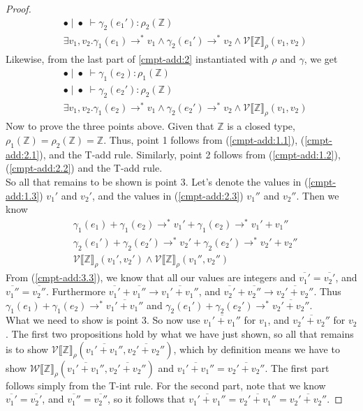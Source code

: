 \documentclass[twoside,11pt,openright]{report}
\theoremstyle{definition}
\newcommand{\expr}{e}
\newcommand{\val}{v}
\newcommand{\Num}[1]{\overline{#1}}
\newcommand{\Tint}{\mathbb{Z}}
\newcommand{\emptenv}{\bullet}
\newcommand{\empvenv}{\bullet}
\newcommand{\jdg}[4]{#1 \; | \; #2 \; \vdash #3 : #4}
\newcommand{\step}{\rightarrow}
\newcommand{\stepS}{\rightarrow^*}
\newcommand{\WtInp}[2]{\mathcal{W} \llbracket #1 \rrbracket_{#2}}
\newcommand{\ValInp}[2]{\mathcal{V} \llbracket #1 \rrbracket_{#2}}
\begin{document}
\begin{proof}
\begin{align}
    &\jdg{\emptenv}{\empvenv}{\gamma_2(\expr_1')}{\rho_2(\Tint)}\label{cmpt-add:1.2}\\
    &\exists \val_1, \val_2 . \gamma_1(\expr_1) \stepS \val_1 \land \gamma_2(\expr_1') \stepS \val_2 \land \ValInp{\Tint}{\rho}(\val_1, \val_2)\label{cmpt-add:1.3}
  \end{align}
  Likewise, from the last part of \ref*{cmpt-add:2} instantiated with $\rho$ and $\gamma$, we get
  \begin{align}
    &\jdg{\emptenv}{\empvenv}{\gamma_1(\expr_2)}{\rho_1(\Tint)}\label{cmpt-add:2.1}\\
    &\jdg{\emptenv}{\empvenv}{\gamma_2(\expr_2')}{\rho_2(\Tint)}\label{cmpt-add:2.2}\\
    &\exists \val_1, \val_2 . \gamma_1(\expr_2) \stepS \val_1 \land \gamma_2(\expr_2') \stepS \val_2 \land \ValInp{\Tint}{\rho}(\val_1, \val_2)\label{cmpt-add:2.3}
  \end{align}
  Now to prove the three points above. Given that $\Tint$ is a closed type, $\rho_1(\Tint) = \rho_2(\Tint) = \Tint$. Thus, point 1 follows from (\ref*{cmpt-add:1.1}), (\ref*{cmpt-add:2.1}), and the T-add rule. Similarly, point 2 follows from (\ref*{cmpt-add:1.2}), (\ref*{cmpt-add:2.2}) and the T-add rule.\\
  So all that remains to be shown is point 3. Let's denote the values in (\ref*{cmpt-add:1.3}) $\val_1'$ and $\val_2'$, and the values in (\ref*{cmpt-add:2.3}) $\val_1''$ and $\val_2''$. Then we know
  \begin{align}
    &\gamma_1(\expr_1) + \gamma_1(\expr_2) \stepS \val_1' + \gamma_1(\expr_2) \stepS \val_1' + \val_1''\label{cmpt-add:3.1}\\
    &\gamma_2(\expr_1') + \gamma_2(\expr_2') \stepS \val_2' + \gamma_2(\expr_2') \stepS \val_2' + \val_2''\label{cmpt-add:3.2}\\
    &\ValInp{\Tint}{\rho}(\val_1', \val_2') \land \ValInp{\Tint}{\rho}(\val_1'', \val_2'')\label{cmpt-add:3.3}
  \end{align}
  From (\ref*{cmpt-add:3.3}), we know that all our values are integers and $\Num{\val_1'} = \Num{\val_2'}$, and $\Num{\val_1''} = \Num{\val_2''}$. Furthermore
  $\Num{\val_1'} + \Num{\val_1''} \step \Num{\val_1' + \val_1''}$, and $\Num{\val_2'} + \Num{\val_2''} \step \Num{\val_2' + \val_2''}$. Thus $\gamma_1(\expr_1) + \gamma_1(\expr_2) \stepS \Num{\val_1' + \val_1''}$ and $\gamma_2(\expr_1') + \gamma_2(\expr_2') \stepS \Num{\val_2' + \val_2''}$.\\
  What we need to show is point 3. So now use $\Num{\val_1' + \val_1''}$ for $\val_1$, and $\Num{\val_2' + \val_2''}$ for $\val_2$. The first two propositions hold by what we have just shown, so all that remains is to show $\ValInp{\Tint}{\rho}(\Num{\val_1' + \val_1''}, \Num{\val_2' + \val_2''})$, which by definition means we have to show $\WtInp{\Tint}{\rho}(\Num{\val_1' + \val_1''}, \Num{\val_2' + \val_2''})$ and $\Num{\val_1' + \val_1''} = \Num{\val_2' + \val_2''}$. The first part follows simply from the T-int rule. For the second part, note that we know $\Num{\val_1'} = \Num{\val_2'}$, and $\Num{\val_1''} = \Num{\val_2''}$, so it follows that $\Num{\val_1' + \val_1''} = \Num{\val_2' + \val_1''} = \Num{\val_2' + \val_2''}$.

\end{proof}
\end{document}
